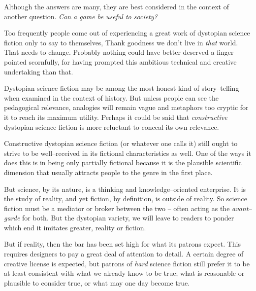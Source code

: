 

Although the answers are many, they are best considered in the context of another question. {\it Can a game be useful to society?}

Too frequently people come out of experiencing a great work of dystopian science fiction only to say to themselves, Thank goodness we don't live in {\it that} world. That needs to change. Probably nothing could have better deserved a finger pointed scornfully, for having prompted this ambitious technical and creative undertaking than that.

Dystopian science fiction may be among the most honest kind of story--telling when examined in the context of history. But unless people can see the pedagogical relevance, analogies will remain vague and metaphors too cryptic for it to reach its maximum utility. Perhaps it could be said that {\it constructive} dystopian science fiction is more reluctant to conceal its own relevance.

    {}

Constructive dystopian science fiction (or whatever one calls it) still ought to strive to be well--received in its fictional characteristics as well. One of the ways it does this is in being only partially fictional because it is the plausible scientific dimension that usually attracts people to the genre in the first place.

But science, by its nature, is a thinking and knowledge--oriented enterprise. It is the study of reality, and yet fiction, by definition, is outside of reality. So science fiction must be a mediator or broker between the two -- often acting as the {\it avant--garde} for both. But the dystopian variety, we will leave to readers to ponder which end it imitates greater, reality or fiction.

But if reality, then the bar has been set high for what its patrons expect. This requires designers to pay a great deal of attention to detail. A certain degree of creative license is expected, but patrons of {\it hard} science fiction still prefer it to be at least consistent with what we already know to be true; what is reasonable or plausible to consider true, or what may one day become true.

